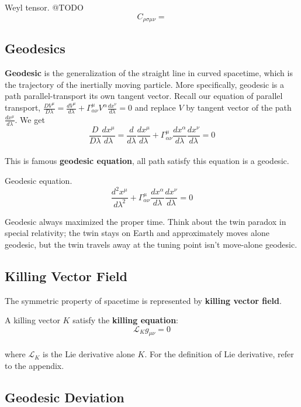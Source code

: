 \documentclass[12pt]{article}
\theoremstyle{mystyle}{\newtheorem{definition}{Definition}[subsection]}
\theoremstyle{mystyle}{\newtheorem{theorem}[definition]{Theorem}}
\theoremstyle{mystyle}{\newtheorem*{remark}{Remark}}
\theoremstyle{mystyle}{\newtheorem{example}{Example}[subsection]}
\theoremstyle{mystyle}{\newtheorem{examples}{Examples}[subsection]}
\theoremstyle{mystyle}{\newtheorem{cthm}{}[subsection]}
\begin{document}
\begin{definition}
  Weyl tensor. @TODO
  \[C_{\rho\sigma\mu\nu} = \]
\end{definition}
\subsection{Geodesics}

\textbf{Geodesic} is the generalization of the straight line in curved spacetime, which is the trajectory of the inertially moving particle.
More specifically, geodesic is a path parallel-transport its own tangent vector.
Recall our equation of parallel transport, \(\frac{DV^{\mu}}{D\lambda} =
\frac{dV^{\mu}}{d\lambda}+ \Gamma^{\mu}_{\alpha\nu}V^{\alpha}\frac{dx^{\nu}}{d\lambda} = 0\) and replace \(V\)
by tangent vector of the path \(\frac{dx^{\mu}}{d\lambda}\). We get
\[\frac{D}{D\lambda}\frac{dx^{\mu}}{d\lambda} =
  \frac{d}{d\lambda}\frac{dx^{\mu}}{d\lambda}+ \Gamma^{\mu}_{\alpha\nu}\frac{dx^{\alpha}}{d\lambda}\frac{dx^{\nu}}{d\lambda} = 0\]\\
This is famous \textbf{geodesic equation}, all path satisfy this equation is a geodesic.

\begin{definition}
  Geodesic equation.
  \[\frac{d^2 x^{\mu}}{d\lambda^2}+ \Gamma^{\mu}_{\alpha\nu}\frac{dx^{\alpha}}{d\lambda}\frac{dx^{\nu}}{d\lambda} = 0\]
\end{definition}

Geodesic always maximized the proper time. Think about the twin paradox in special relativity; the twin stays on Earth and approximately moves alone geodesic,
but the twin travels away at the tuning point isn't move-alone geodesic.

\subsection{Killing Vector Field}
The symmetric property of spacetime is represented by \textbf{killing vector field}.
\begin{definition}
  A killing vector \(K\) satisfy the \textbf{killing equation}:
  \[\mathcal{L}_{K}g_{\mu\nu}= 0\]\\
  where \(\mathcal{L}_{K}\) is the Lie derivative alone \(K\). For the definition of Lie derivative, refer to the appendix.
\end{definition}


\subsection{Geodesic Deviation}
\newpage
\end{document}
